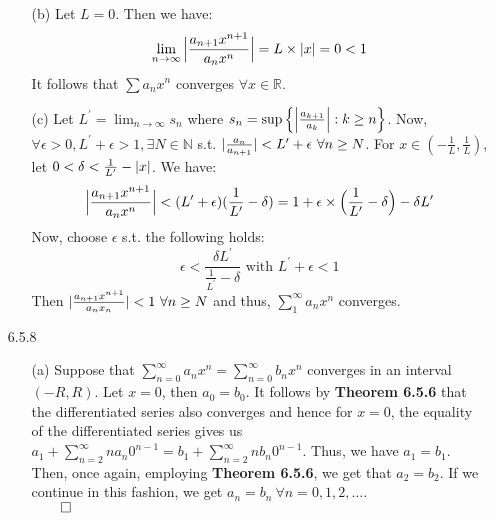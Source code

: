 \documentclass[11pt]{article}
\DeclarePairedDelimiter\abs{\lvert}{\rvert}%
\DeclarePairedDelimiter\absb{\Big\lvert}{\Big\rvert}%
\newcommand{\nats}{\mathbb{N}}
\newcommand{\reals}{\mathbb{R}}
\begin{document}
\begin{itemize}
\begin{itemize}
            \item[(b)]
                Let $L = 0$. Then we have:
                \begin{equation*}
                    \lim_{n \to \infty}{\absb{\frac{a_{n + 1}x^{n + 1}}{a_nx^n}}}
                        = L \times \abs{x} = 0 < 1
                \end{equation*}
                It follows that $\sum a_nx^n$ converges $\forall x \in \reals$.

            \item[(c)]
                Let $L^\prime = \lim_{n \to \infty} s_n$ where $s_n =
                \sup\Big\{\absb{\frac{a_{k + 1}}{a_k}} : k \geq n \Big\}$.
                Now, $\forall \epsilon > 0, L^\prime + \epsilon > 1, \exists N
                \in \nats$ s.t. $\abs{\frac{a_n}{a_{n + 1}}} < L^\prime +
                \epsilon \ \forall n \geq N$. For $x \in (-\frac{1}{L},
                \frac{1}{L})$, let $0 < \delta < \frac{1}{L^\prime} - \abs{x}$.
                We have:
                \begin{equation*}
                    \absb{\frac{a_{n + 1}x^{n + 1}}{a_nx^n}}
                        < (L^\prime + \epsilon)(\frac{1}{L^\prime} - \delta)
                        = 1 + \epsilon \times \Big(\frac{1}{L^\prime}
                            - \delta\Big) - \delta L^\prime
                \end{equation*}
                Now, choose $\epsilon$ s.t. the following holds:
                \begin{equation*}
                    \epsilon < \frac{\delta L^\prime}{\frac{1}{L^\prime} - \delta}
                        \text{ with } L^\prime + \epsilon < 1
                \end{equation*}
                Then $\abs{\frac{a_{n + 1}x^{n + 1}}{a_nx_n}} < 1 \ \forall n
                \geq N$ and thus, $\sum_{1}^{\infty} a_nx^n$ converges.
        \end{itemize}

    \item[6.5.8]
        \begin{itemize}
            \item[(a)]
                Suppose that $\sum_{n = 0}^\infty a_nx^n = \sum_{n = 0}^\infty
                b_nx^n$ converges in an interval $(-R, R)$. Let $x = 0$, then
                $a_0 = b_0$. It follows by \textbf{Theorem 6.5.6} that the
                differentiated series also converges and hence for $x = 0$, the
                equality of the differentiated series gives us $a_1 + \sum_{n =
                2}^\infty na_n0^{n - 1} = b_1 + \sum_{n = 2}^\infty nb_n0^{n -
                1}$. Thus, we have $a_1 = b_1$. Then, once again, employing
                \textbf{Theorem 6.5.6}, we get that $a_2 = b_2$. If we continue
                in this fashion, we get $a_n = b_n \ \forall n = 0, 1, 2,
                \dots$.\\
                $\qed$
        \end{itemize}


\end{itemize}
\end{document}
